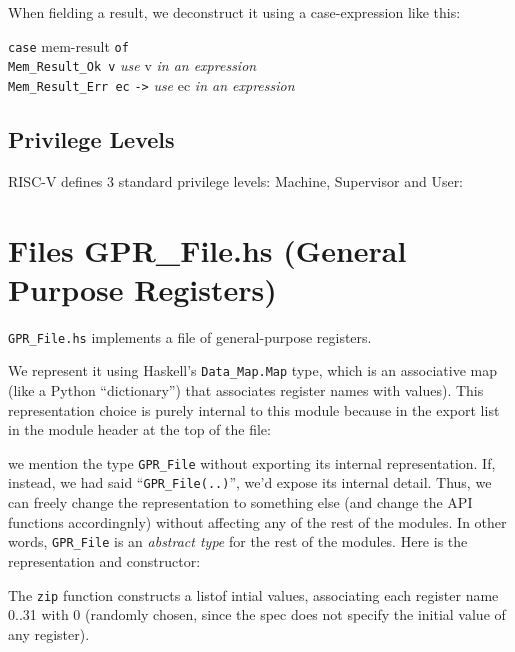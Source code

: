 \documentclass[11pt]{article}
\newcommand{\hm}{\hspace*{1em}}
\newcommand{\hmmm}{\hspace*{3em}}
\begin{document}
When fielding a result, we deconstruct it using a case-expression like this:
\begin{tabbing}
\hmmm \= {\tt case} mem-result {\tt of} \\
      \> \hm \= {\tt Mem\_Result\_Ok v} \hm {\tt ->} \= \emph{use} v \emph{in an expression} \\
      \>     \> {\tt Mem\_Result\_Err ec}   {\tt ->} \> \emph{use} ec \emph{in an expression}
\end{tabbing}


\subsection{Privilege Levels}

RISC-V defines 3 standard privilege levels: Machine, Supervisor and User:




\section{Files GPR\_File.hs (General Purpose Registers)}

\label{sec_gprs}

\verb|GPR_File.hs| implements a file of general-purpose registers.

We represent it using Haskell's \verb|Data_Map.Map| type, which is an
associative map (like a Python ``dictionary'') that associates
register names with values).  This representation choice is purely
internal to this module because in the export list in the module
header at the top of the file:



we mention the type \verb|GPR_File| without exporting its internal
representation.  If, instead, we had said ``\verb|GPR_File(..)|'',
we'd expose its internal detail.  Thus, we can freely change the
representation to something else (and change the API functions
accordingnly) without affecting any of the rest of the modules.  In
other words, \verb|GPR_File| is an \emph{abstract type} for the rest
of the modules.  Here is the representation and constructor:



The \verb|zip| function constructs a listof intial values, associating
each register name 0..31 with 0 (randomly chosen, since the spec does
not specify the initial value of any register).
\end{document}
